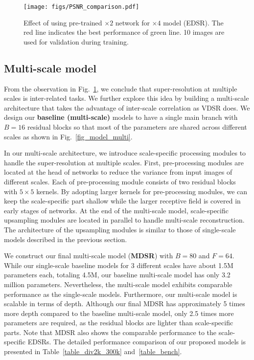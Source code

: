 \documentclass[10pt,twocolumn,letterpaper]{article}
\begin{document}
\begin{figure}[h]
		\begin{center}
			\texttt{[image: figs/PSNR\_comparison.pdf]}
		\end{center}
		\captionsetup{justification=raggedright,singlelinecheck=false}
		\caption{Effect of using pre-trained $\times 2$ network for $\times 4$ model (EDSR). The red line indicates the best performance of green line. 10 images are used for validation during training.}
		\label{fig_pretrained}
	\end{figure}
	
	\subsection{Multi-scale model}
	\label{sec_3_multi}    
	
	From the observation in Fig.~\ref{fig_pretrained}, we conclude that super-resolution at multiple scales is inter-related tasks.
	We further explore this idea by building a multi-scale architecture that takes the advantage of inter-scale correlation as VDSR \cite{kim2016accurate} does.
	We design our \textbf{baseline (multi-scale)} models to have a single main branch with $B=16$ residual blocks so that most of the parameters are shared across different scales as shown in Fig.~\ref{fig_model_multi}.
	
	In our multi-scale architecture, we introduce scale-specific processing modules to handle the super-resolution at multiple scales.
	First, pre-processing modules are located at the head of networks to reduce the variance from input images of different scales.
	Each of pre-processing module consists of two residual blocks with $5 \times 5$ kernels.
	By adopting larger kernels for pre-processing modules, we can keep the scale-specific part shallow while the larger receptive field is covered in early stages of networks.
	At the end of the multi-scale model, scale-specific upsampling modules are located in parallel to handle multi-scale reconstruction.
	The architecture of the upsampling modules is similar to those of single-scale models described in the previous section.
	
	We construct our final multi-scale model (\textbf{MDSR}) with $B=80$ and $F=64$.
	While our single-scale baseline models for 3 different scales have about 1.5M parameters each, totaling 4.5M, our baseline multi-scale model has only 3.2 million parameters. Nevertheless, the multi-scale model exhibits comparable performance as the single-scale models. Furthermore, our multi-scale model is scalable in terms of depth. Although our final MDSR has approximately 5 times more depth compared to the baseline multi-scale model, only 2.5 times more parameters are required, as the residual blocks are lighter than scale-specific parts. Note that MDSR also shows the comparable performance to the scale-specific EDSRs. The detailed performance comparison of our proposed models is presented in Table~\ref{table_div2k_300k} and~\ref{table_bench}.
	
\end{document}
